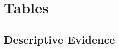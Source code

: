 \documentclass[12pt]{article}
\begin{document}
\clearpage

\section{Tables}

\subsection{Descriptive Evidence}
\end{document}

